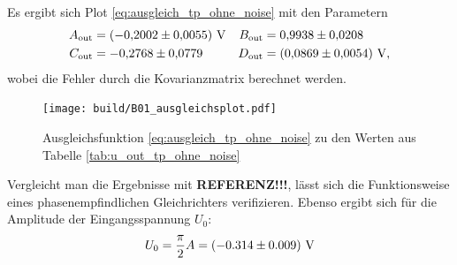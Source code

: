 Es ergibt sich Plot \ref{eq:ausgleich_tp_ohne_noise} mit den Parametern
\begin{align*}
    A_\text{out} &= \left(\num[]{-0.2002} \pm \num[]{0.0055}\right) \, \unit{\volt} & B_\text{out} &=  \num[]{0.9938} \pm \num[]{0.0208} \\
    C_\text{out} &= \num[]{-0.2768} \pm \num[]{0.0779} & D_\text{out} &= \left(\num[]{0.0869} \pm \num[]{0.0054}\right) \, \unit[]{\volt},
\end{align*}
wobei die Fehler durch die Kovarianzmatrix berechnet werden.
%
\begin{figure}[H]
    \texttt{[image: build/B01\_ausgleichsplot.pdf]}
    \caption[]{Ausgleichsfunktion \eqref{eq:ausgleich_tp_ohne_noise} zu den Werten aus Tabelle \ref{tab:u_out_tp_ohne_noise}}
    \label{fig:ausgleichsplot1}
\end{figure}

\noindent Vergleicht man die Ergebnisse mit \textbf{REFERENZ!!!}, lässt sich die Funktionsweise eines phasenempfindlichen Gleichrichters verifizieren.
Ebenso ergibt sich für die Amplitude der Eingangsspannung $U_0$:
\begin{align*}
    U_0 = \frac{\pi}{2} A = \left(-0.314 \pm 0.009\right) \, \unit[]{\volt}
\end{align*}
